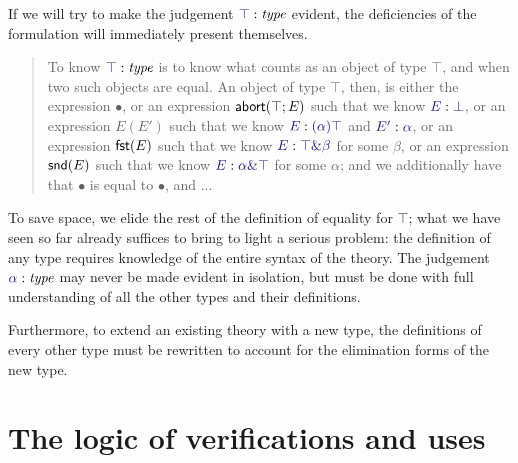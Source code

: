 \documentclass[main.tex]{subfiles}
\begin{document}
If we will try to make the judgement $\type\top$ evident, the deficiencies of
the formulation will immediately present themselves.

\begin{quote}
To know $\type\top$ is to know what counts as an object of type $\top$, and when
two such objects are equal. An object of type $\top$, then, is either the
expression $\bullet$, or an expression $\mathsf{abort}(\top;E)$ such that we know
$\ofty{E}{\bot}$, or an expression $E(E')$ such that we know $\ofty{E}{(\alpha)\top}$ and
$\ofty{E'}{\alpha}$, or an expression $\mathsf{fst}(E)$ such that we know $\ofty{E}{\product\top\beta}$
for some $\beta$, or an expression $\mathsf{snd}(E)$ such that we know
$\ofty{E}{\product\alpha\top}$ for some $\alpha$; and we additionally have that $\bullet$
is equal to $\bullet$, and ...
\end{quote}

To save space, we elide the rest of the definition of equality for $\top$; what
we have seen so far already suffices to bring to light a serious problem: the
definition of any type requires knowledge of the entire syntax of the theory.
The judgement $\type\alpha$ may never be made evident in isolation, but must be
done with full understanding of all the other types and their definitions.

Furthermore, to extend an existing theory with a new type, the definitions of
every other type must be rewritten to account for the elimination forms of the
new type.

\section{The logic of verifications and uses}
\end{document}
